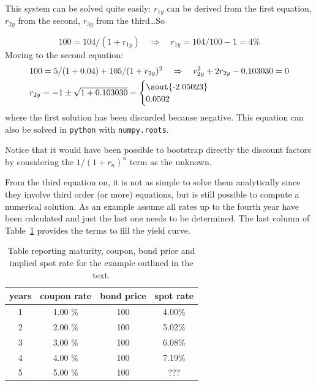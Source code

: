 This system can be solved quite easily: $r_{1y}$ can be derived from the first equation, $r_{2y}$ from the second, $r_{3y}$ from the third\ldots So

\begin{equation}
100 = 104 / (1 + r_{1y})\quad\Rightarrow\quad r_{1y} = 104/100 - 1 = 4\%
\end{equation}
Moving to the second equation:
\begin{equation}
\begin{split}
& 100 = 5 / (1 + 0.04) + 105 / (1 + r_{2y})^{2}\quad\Rightarrow\quad r_{2y}^2  + 2 r_{2y}  - 0.103030 = 0 \\
& r_{2y} = - 1 \pm \sqrt{1 + 0.103030} = \begin{cases}\text{\sout{-2.05023}} \\ 0.0502\end{cases}
\end{split}
\end{equation}
where the first solution has been discarded because negative. This equation can also be solved in \texttt{python} with \texttt{numpy.roots}.

Notice that it would have been possible to bootstrap directly the discount factors by considering the $1/(1+r_n)^n$ term as the unknown.

From the third equation on, it is not as simple to solve them analytically since they involve third order (or more) equations, but is still possible to compute a numerical solution.
As an example assume all rates up to the fourth year have been calculated and just the last one needs to be determined. The last column of Table~\ref{tab:rates} provides the terms to fill the yield curve.

\begin{table}[htb]
\begin{center}
\begin{tabular}{|c|c|c|c|}
\hline
\textbf{years} & \textbf{coupon rate} & \textbf{bond price} & \textbf{spot rate} \\
\hline
1 & 1.00 \% & 100 & 4.00\% \\
\hline
2 & 2.00 \% & 100 & 5.02\% \\
\hline
3 & 3.00 \% & 100 & 6.08\% \\
\hline
4 & 4.00 \% & 100 & 7.19\% \\
\hline
5 & 5.00 \% & 100 & ??? \\
\hline
\end{tabular}
\end{center}
\caption{Table reporting maturity, coupon, bond price and implied spot rate for the example outlined in the text.}
\label{tab:rates}
\end{table}

